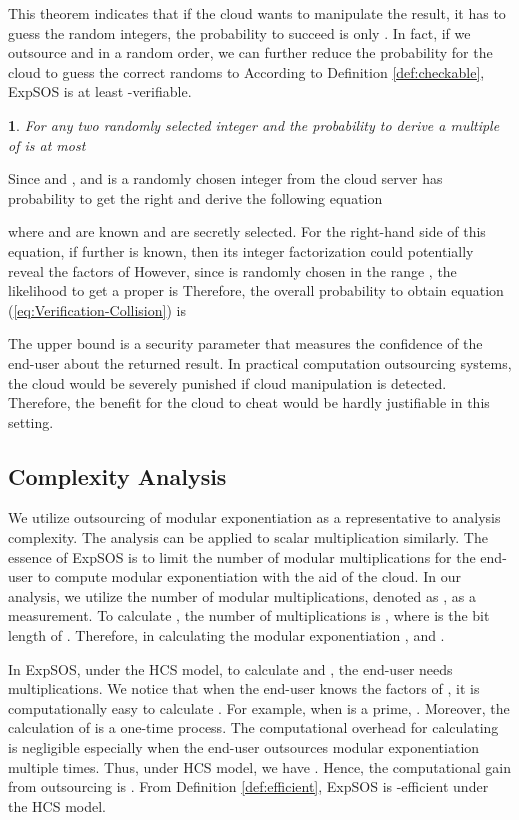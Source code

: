 \documentclass[english,draftcls,onecolumn,11pt]{IEEEtran}
\theoremstyle{definition}
\theoremstyle{plain}
\newtheorem{thm}{\protect\theoremname}
\theoremstyle{plain}
\theoremstyle{definition}
\providecommand{\theoremname}{Theorem}
\begin{document}
This theorem indicates that if the cloud wants to manipulate the result,
it has to guess the random integers, the probability to succeed is
only . In fact, if we outsource 
and  in a random order, we can further reduce
the probability for the cloud to guess the correct randoms to 
According to Definition \ref{def:checkable}, ExpSOS is at least -verifiable. 
\begin{thm}
For any two randomly selected integer  and  the probability
to derive a multiple of  is at most  \end{thm}
\begin{IEEEproof}
Since  and ,
and  is a randomly chosen integer from  the cloud
server has probability  to get the right  and derive
the following equation

where  and  are known and  are secretly
selected. For the right-hand side of this equation, if further 
is known, then its integer factorization could potentially reveal
the factors of  However, since  is randomly chosen
in the range , the likelihood to get a proper  is
 Therefore, the overall probability to obtain equation (\ref{eq:Verification-Collision})
is 
\end{IEEEproof}
The upper bound  is a security parameter that measures the confidence
of the end-user about the returned result. In practical computation
outsourcing systems, the cloud would be severely punished if cloud
manipulation is detected. Therefore, the benefit for the cloud to
cheat would be hardly justifiable in this setting. 


\subsection{Complexity Analysis}

We utilize outsourcing of modular exponentiation as a representative
to analysis complexity. The analysis can be applied to scalar multiplication
similarly. The essence of ExpSOS is to limit the number of modular
multiplications for the end-user to compute modular exponentiation
with the aid of the cloud. In our analysis, we utilize the number
of modular multiplications, denoted as , as a measurement. To
calculate , the number of multiplications is ,
where  is the bit length of \cite{zhong2000modular}.
Therefore, in calculating the modular exponentiation ,
 and .

In ExpSOS, under the HCS model, to calculate  and , the
end-user needs  multiplications. We notice that when the end-user
knows the factors of , it is computationally easy to calculate
. For example, when  is a prime, . Moreover,
the calculation of  is a one-time process. The computational
overhead for calculating  is negligible especially when
the end-user outsources modular exponentiation multiple times. Thus,
under HCS model, we have . Hence, the computational
gain from outsourcing is .
From Definition \ref{def:efficient}, ExpSOS is -efficient
under the HCS model. 
\end{document}
